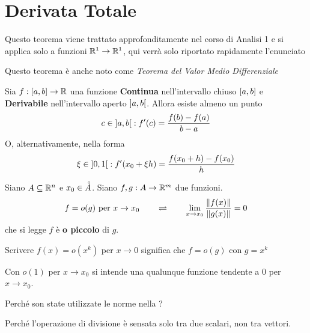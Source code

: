\section{Derivata Totale}
\begin{theorem}[di Lagrange]\leavevmode\vspace*{-\baselineskip}
	\label{teo:lagrange}
	\begin{note}
		Questo teorema viene trattato approfonditamente nel corso di Analisi 1 e si applica solo a funzioni $\mathbb{R}^1 \to \mathbb{R}^1$, qui verrà solo riportato rapidamente l'enunciato
	\end{note}
	\begin{note}
		Questo teorema è anche noto come \textit{Teorema del Valor Medio Differenziale}
	\end{note}
	Sia $f: \left[a,b\right] \to \mathbb{R}$ una funzione \textbf{Continua} nell'intervallo chiuso $\left[a,b\right]$ e \textbf{Derivabile} nell'intervallo aperto $\left]a,b\right[$. Allora esiste almeno un punto
	\[c \in \left]a,b\right[ : f'(c) = \frac{f(b)-f(a)}{b - a}\]
	O, alternativamente, nella forma
	\[\xi \in \left]0,1\right[ : f'(x_0 + \xi h) = \frac{f(x_0 + h)-f(x_0)}{h}\]
\end{theorem}
\begin{definition}[o piccolo]
	\label{def:o_piccolo}
	Siano $A \subseteq \mathbb{R}^n$ e $x_0 \in \accentset{\circ}{A}$. Siano $f,g: A \to \mathbb{R}^m$ due funzioni.
	\[f=o(g) \text{ per } x \to x_0 \qquad \rightleftharpoons \qquad \lim\limits_{x \to x_0} \frac{\left\|f(x)\right\|}{\left\|g(x)\right\|} = 0\]
	che si legge $f$ è \textbf{o piccolo} di $g$.
	\begin{note}
		Scrivere $f(x) = o(x^k)$ per $x \to 0$ significa che $f = o(g)$ con $g = x^k$
	\end{note}
	\begin{note}
		Con $o(1)$ per $x \to x_0$ si intende una qualunque funzione tendente a $0$ per $x \to x_0$.
	\end{note}
\end{definition}
\begin{exercise}
	Perché son state utilizzate le norme nella ?
	\begin{solution}
		Perché l'operazione di divisione è sensata solo tra due scalari, non tra vettori.
	\end{solution}
\end{exercise}
